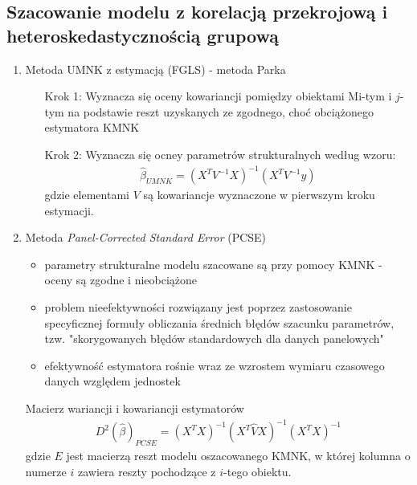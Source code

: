 \subsection{Szacowanie modelu z korelacją przekrojową i heteroskedastycznością grupową}
\begin{enumerate}
\item Metoda UMNK z estymacją (FGLS) - metoda Parka
\begin{itemize}
\item[Krok 1:] Wyznacza się oceny kowariancji pomiędzy obiektami Mi-tym i $ j $-tym na podstawie reszt uzyskanych ze zgodnego, choć obciążonego estymatora KMNK
\item[Krok 2:] Wyznacza się ocney parametrów strukturalnych według wzoru:
\begin{gather*}
\hat \beta_{UMNK}=
\left(X^TV^{-1}X\right)^{-1}
\left(X^TV^{-1}y\right)
\end{gather*}
gdzie elementami $ V $ są kowariancje wyznaczone w pierwszym kroku estymacji.
\end{itemize}
\item Metoda \emph{Panel-Corrected Standard Error} (PCSE)
\begin{itemize}
\item parametry strukturalne modelu szacowane są przy pomocy KMNK - oceny są zgodne i nieobciążone
\item problem nieefektywności rozwiązany jest poprzez zastosowanie specyficznej formuły obliczania średnich błędów szacunku parametrów, tzw. "skorygowanych błędów standardowych dla danych panelowych"
\item efektywność estymatora rośnie wraz ze wzrostem wymiaru czasowego danych względem jednostek
\end{itemize}
Macierz wariancji i kowariancji estymatorów
\begin{gather*}
D^2\left(\hat \beta \right)_{PCSE}=\left(X^TX\right)^{-1}
\left(X^T\hat VX\right)^{-1}
\left(X^TX\right)^{-1}
\end{gather*}
gdzie $ E $ jest macierzą reszt modelu oszacowanego KMNK, w której kolumna o numerze $ i $ zawiera reszty pochodzące z $ i $-tego obiektu.
\end{enumerate}
